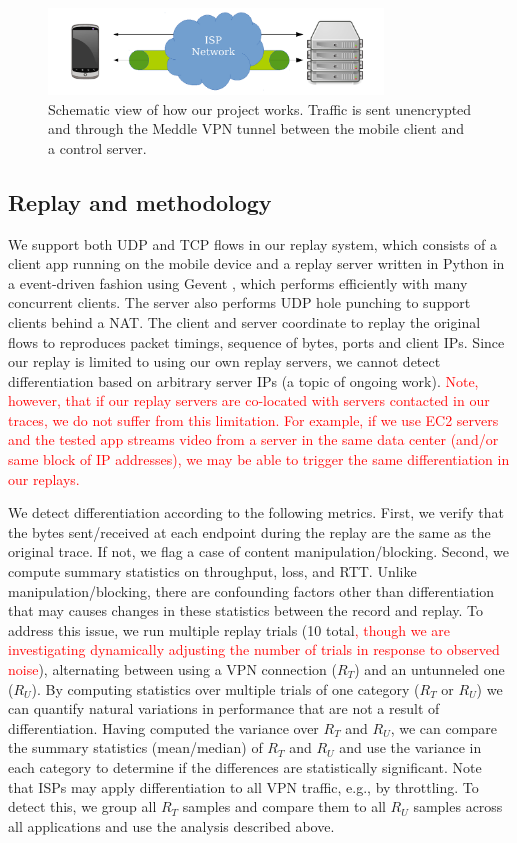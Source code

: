 \documentclass[letterpaper]{sig-alternate-2013}
\newcommand{\edit}[1]{\textcolor{red}{#1}}
\newcommand{\edit}[1]{\textcolor{black}{#1}}
\begin{document}
\begin{figure}[t]
\centering
\includegraphics[width=3.5in]{figures/meddle}
\vspace{-0.5cm}
\caption{Schematic view of how our project works. Traffic is sent unencrypted and through the Meddle VPN tunnel between the mobile client and a control server.}
\label{fig:meddle}
\end{figure}

\subsection{Replay and methodology}
We support both UDP and TCP flows in our replay system, which consists of a client app running on the mobile device and a replay server written in Python in a event-driven fashion using Gevent \cite{gevent}, which performs efficiently with many concurrent clients. The server also performs UDP hole punching to support clients behind a NAT. The client and server coordinate to replay the original flows to reproduces packet timings, sequence of bytes, ports and client IPs. Since our replay is limited to using our own replay servers, we cannot detect differentiation based on arbitrary server IPs (a topic of ongoing work). \edit{Note, however, that if our replay servers are co-located with servers contacted in our traces, we do not suffer from this limitation. For example, if we use EC2 servers and the tested app streams video from a server in the same data center (and/or same block of IP addresses), we may be able to trigger the same differentiation in our replays.}

We detect differentiation according to the following metrics. First, we verify that the bytes sent/received at each endpoint during the replay are the same as the original trace. If not, we flag a case of content manipulation/blocking. Second, we compute summary statistics on throughput, loss, and RTT. Unlike manipulation/blocking, there are confounding factors other than differentiation that may causes changes in these statistics between the record and replay.
To address this issue, we run multiple replay trials (10 total\edit{, though we are investigating dynamically adjusting the number of trials in response to observed noise}), alternating between using a VPN connection ($R_T$) and an untunneled one ($R_U$). By computing statistics over multiple trials of one category ($R_T$ or $R_U$) we can quantify natural variations in performance that are not a result of differentiation. Having computed the variance over $R_T$ and $R_U$, we can compare the summary statistics (mean/median) of $R_T$ and $R_U$ and use the variance in each category to determine if the differences are statistically significant.
Note that ISPs may apply differentiation to all VPN traffic, e.g., by throttling. To detect this, we group all $R_T$ samples and compare them to all $R_U$ samples across all applications and use the analysis described above.
\end{document}
